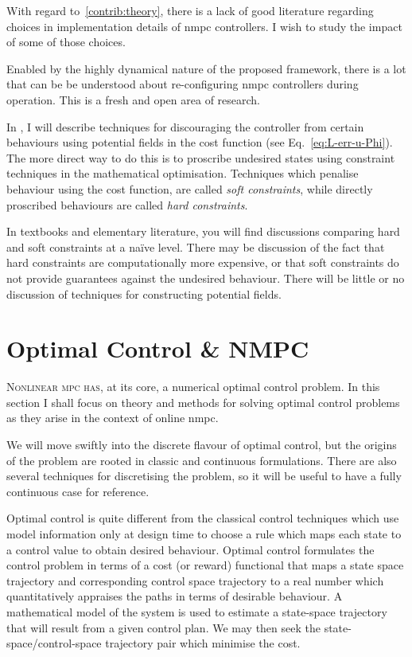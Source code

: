 With regard to~\ref{contrib:theory}, there is a lack of good literature
regarding choices in implementation details of \ac{nmpc} controllers. I wish to
study the impact of some of those choices.

Enabled by the highly dynamical nature of the proposed framework, there is a lot
that can be be understood about re-configuring \ac{nmpc} controllers during
operation. This is a fresh and open area of research.

In , I will describe techniques for discouraging the controller
from certain behaviours using potential fields in the cost function (see
Eq.~\eqref{eq:L-err-u-Phi}). The more direct way to do this is to proscribe
undesired states using constraint techniques in the mathematical
optimisation.
Techniques which penalise behaviour using the cost function, are called
\emph{soft constraints}, while directly proscribed behaviours are called
\emph{hard constraints}.

In textbooks and elementary literature, you will find discussions comparing hard
and soft constraints at a naïve level. There may be discussion of the fact that
hard constraints are computationally more expensive, or that soft constraints do
not provide guarantees against the undesired behaviour. There will be little or
no discussion of techniques for constructing potential fields.



\section{Optimal Control \& NMPC}%
\label{sec:NMPC}


\textsc{Nonlinear \acs{mpc} has}, at its core, a numerical optimal control
problem. In this section I shall focus on theory and methods for solving optimal
control problems as they arise in the context of online \ac{nmpc}.

We will move swiftly into the discrete flavour of optimal control, but the
origins of the problem are rooted in classic and continuous formulations. There
are also several techniques for discretising the problem, so it will be useful
to have a fully continuous case for reference.

Optimal control is quite different from the classical control techniques which
use model information only at design time to choose a rule which maps each state
to a control value to obtain desired behaviour. Optimal control formulates the
control problem in terms of a cost (or reward) functional that maps a state
space trajectory and corresponding control space trajectory to a real number
which quantitatively appraises the paths in terms of desirable behaviour. A
mathematical model of the system is used to estimate a state-space trajectory
that will result from a given control plan. We may then seek the
state-space/control-space trajectory pair which minimise the cost.

